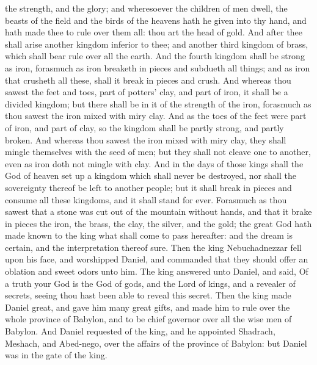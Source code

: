 the strength, and the glory; and wheresoever the children of men dwell, the beasts of the field and the birds of the heavens hath he given into thy hand, and hath made thee to rule over them all: thou art the head of gold. And after thee shall arise another kingdom inferior to thee; and another third kingdom of brass, which shall bear rule over all the earth. And the fourth kingdom shall be strong as iron, forasmuch as iron breaketh in pieces and subdueth all things; and as iron that crusheth all these, shall it break in pieces and crush. And whereas thou sawest the feet and toes, part of potters’ clay, and part of iron, it shall be a divided kingdom; but there shall be in it of the strength of the iron, forasmuch as thou sawest the iron mixed with miry clay. And as the toes of the feet were part of iron, and part of clay, so the kingdom shall be partly strong, and partly broken. And whereas thou sawest the iron mixed with miry clay, they shall mingle themselves with the seed of men; but they shall not cleave one to another, even as iron doth not mingle with clay. And in the days of those kings shall the God of heaven set up a kingdom which shall never be destroyed, nor shall the sovereignty thereof be left to another people; but it shall break in pieces and consume all these kingdoms, and it shall stand for ever. Forasmuch as thou sawest that a stone was cut out of the mountain without hands, and that it brake in pieces the iron, the brass, the clay, the silver, and the gold; the great God hath made known to the king what shall come to pass hereafter: and the dream is certain, and the interpretation thereof sure.  Then the king Nebuchadnezzar fell upon his face, and worshipped Daniel, and commanded that they should offer an oblation and sweet odors unto him. The king answered unto Daniel, and said, Of a truth your God is the God of gods, and the Lord of kings, and a revealer of secrets, seeing thou hast been able to reveal this secret. Then the king made Daniel great, and gave him many great gifts, and made him to rule over the whole province of Babylon, and to be chief governor over all the wise men of Babylon. And Daniel requested of the king, and he appointed Shadrach, Meshach, and Abed-nego, over the affairs of the province of Babylon: but Daniel was in the gate of the king. 

